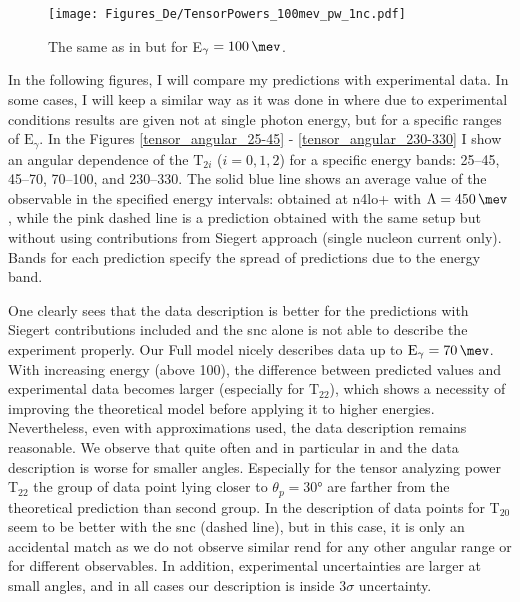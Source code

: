     \begin{figure}[h]
        \begin{center}
        \texttt{[image: Figures\_De/TensorPowers\_100mev\_pw\_1nc.pdf]}
        \end{center}
        \caption{The same as in  but for E$_\gamma=\SI{100}{\mev}$.}
        \label{tensor_pw_1nc_100mev}
    \end{figure}

    
    In the following figures, I will compare my predictions with experimental data.
    In some cases, I will keep a similar way as it was done
    in \cite{rachek2007} where due to experimental conditions results are given not at single photon energy,
    but for a specific ranges of $\text{E}_\gamma$.
    In the Figures \ref{tensor_angular_25-45} - \ref{tensor_angular_230-330}
    I show an angular dependence of the $\text{T}_{2i}$ ($i=0,1,2$) for a specific energy bands:
    \SIrange[range-phrase=--]{25}{45}{\mev}, \SIrange[range-phrase=--]{45}{70}{\mev},
    \SIrange[range-phrase=--]{70}{100}{\mev}, and \SIrange[range-phrase=--]{230}{330}{\mev}.
    The solid blue line shows an average value of the observable in the specified energy intervals:
    obtained at \gls{n4lo+} with $\Lambda=\SI{450}{\mev}$, while the pink dashed line is a prediction
    obtained with the same setup but without using contributions from Siegert approach
    (single nucleon current only). Bands for each prediction specify the spread of
    predictions due to the energy band.
    

    One clearly sees that the data description is better for the predictions with Siegert contributions included
    and the \gls{snc} alone is not able to describe the experiment properly.
    Our Full model nicely describes data up to $\text{E}_\gamma = \SI{70}{\mev}$.
    With increasing energy (above \SI{100}{\mev}),
    the difference between predicted values and experimental data becomes larger
    (especially for $\text{T}_{22}$), 
    which shows a necessity of improving the theoretical model before applying it to 
    higher energies. Nevertheless, even with approximations used,
    the data description remains reasonable. 
    We observe that quite often and in particular in  and 
    the data description is worse for smaller angles. Especially for the tensor analyzing power T$_{22}$
    the group of data point lying closer to $\theta_p = \ang{30}$ are farther 
    from the theoretical prediction than second group.
    In  the description of data points for T$_{20}$ seem to be better
    with the \gls{snc} (dashed line), but in this case, it is only an accidental match as we do not observe similar rend for any other angular range or for different observables.
    In addition, experimental uncertainties are larger at small angles, and in all cases 
    our description is inside 3$\sigma$ uncertainty.
    




